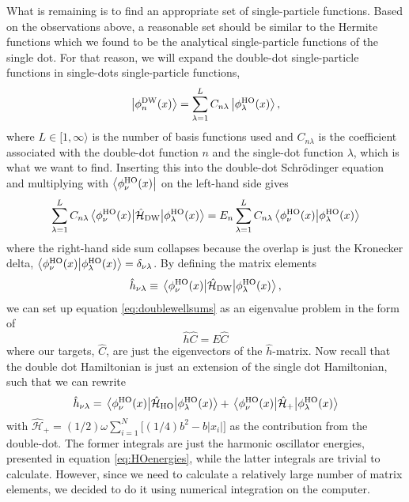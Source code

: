 What is remaining is to find an appropriate set of single-particle functions. Based on the observations above, a reasonable set should be similar to the Hermite functions which we found to be the analytical single-particle functions of the single dot. For that reason, we will expand the double-dot single-particle functions in single-dots single-particle functions,
\begin{equation}
\ket{\phi_n^{\text{DW}}(x)}=\sum_{\lambda=1}^{L}C_{n\lambda}\ket{\phi_{\lambda}^{\text{HO}}(x)},
\end{equation}
where $L\in[1,\infty\rangle$ is the number of basis functions used and $C_{n\lambda}$ is the coefficient associated with the double-dot function $n$ and the single-dot function $\lambda$, which is what we want to find. Inserting this into the double-dot Schrödinger equation and multiplying with $\bra{\phi_{\nu}^{\text{HO}}(x)}$ on the left-hand side gives
\begin{equation}
\label{eq:doublewellsums}
\sum_{\lambda=1}^LC_{n\lambda}\mel{\phi_{\nu}^{\text{HO}}(x)}{\hat{\mathcal{H}}_{\text{DW}}}{\phi_{\lambda}^{\text{HO}}(x)}=E_n\sum_{\lambda=1}^LC_{n\lambda}\braket{\phi_{\nu}^{\text{HO}}(x)}{\phi_{\lambda}^{\text{HO}}(x)}
\end{equation}
where the right-hand side sum collapses because the overlap is just the Kronecker delta, $\braket{\phi_{\nu}^{\text{HO}}(x)}{\phi_{\lambda}^{\text{HO}}(x)}=\delta_{\nu\lambda}$. By defining the matrix elements
\begin{equation}
\hat{h}_{\nu\lambda}\equiv\mel{\phi_{\nu}^{\text{HO}}(x)}{\hat{\mathcal{H}}_{\text{DW}}}{\phi_{\lambda}^{\text{HO}}(x)},
\end{equation}
we can set up equation \eqref{eq:doublewellsums} as an eigenvalue problem in the form of
\begin{equation}
\hat{h}\hat{C}=E\hat{C}
\end{equation}
where our targets, $\hat{C}$, are just the eigenvectors of the $\hat{h}$-matrix. Now recall that the double dot Hamiltonian is just an extension of the single dot Hamiltonian, such that we can rewrite
\begin{equation}
\hat{h}_{\nu\lambda}=\mel{\phi_{\nu}^{\text{HO}}(x)}{\hat{\mathcal{H}}_{\text{HO}}}{\phi_{\lambda}^{\text{HO}}(x)}+\mel{\phi_{\nu}^{\text{HO}}(x)}{\hat{\mathcal{H}}_{\text{+}}}{\phi_{\lambda}^{\text{HO}}(x)}
\end{equation}
with $\hat{\mathcal{H}}_{\text{+}}=(1/2)\omega\sum_{i=1}^N\Big[(1/4)b^2-b|x_i|\Big]$ as the contribution from the double-dot. The former integrals are just the harmonic oscillator energies, presented in equation \eqref{eq:HOenergies}, while the latter integrals are trivial to calculate. However, since we need to calculate a relatively large number of matrix elements, we decided to do it using numerical integration on the computer.

